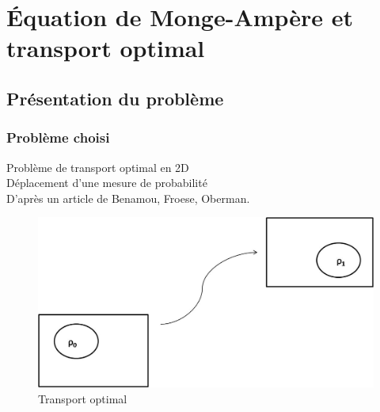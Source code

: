 \documentclass[10pt]{beamer}
\begin{document}
\section{Équation de Monge-Ampère et transport optimal}

\subsection{Présentation du problème}

\begin{frame}
\frametitle{Problème choisi}

Problème de transport optimal en 2D \\

    Déplacement d'une mesure de probabilité \\

    D'après un article de Benamou, Froese, Oberman.

    \bigskip

    \begin{figure}
    \begin{center}
    \includegraphics[scale=0.25]{densite.jpg}
    \caption{Transport optimal}
    \end{center}
    \end{figure}


    \end{frame}
\end{document}
